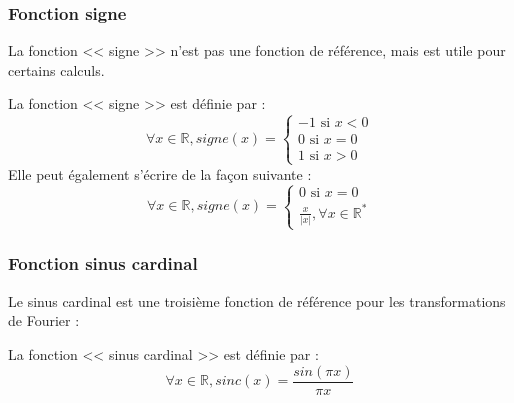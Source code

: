 \documentclass[12pt, a4paper]{article}
\begin{document}
\subsubsection{Fonction signe}

La fonction << signe >> n'est pas une fonction de référence, mais est utile pour certains calculs.

\begin{tcolorbox}
	La fonction << signe >> est définie par :
	\begin{equation*}
		\forall x \in \mathbb{R}, signe(x) = 
		\begin{cases}
			-1 \text{ si } x < 0 \\
			0 \text{ si } x = 0 \\
			1 \text{ si } x > 0
		\end{cases}
	\end{equation*}
	Elle peut également s'écrire de la façon suivante :
	\begin{equation*}
		\forall x \in \mathbb{R}, signe(x) = 
		\begin{cases}
			0 \text{ si } x = 0 \\
			\displaystyle \frac{x}{|x|}, \forall x \in \mathbb{R}^*
		\end{cases}
	\end{equation*}
\end{tcolorbox}

\begin{center}
\end{center}


\clearpage


\subsubsection{Fonction sinus cardinal}

Le sinus cardinal est une troisième fonction de référence pour les transformations de Fourier :

\begin{tcolorbox}
	La fonction << sinus cardinal >> est définie par :
	\begin{equation*}
		\forall x \in \mathbb{R}, sinc(x) = \frac{sin(\pi x)}{\pi x}
	\end{equation*}
\end{tcolorbox}
\end{document}
